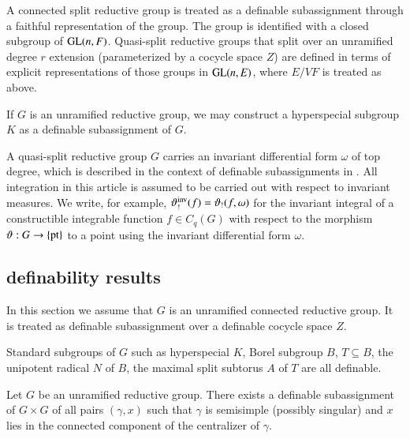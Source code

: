 A connected split reductive group is treated as a definable
subassignment through a faithful representation of the group.  The
group is identified with a closed subgroup of ${\operatorname{GL}}(n,F)$.
Quasi-split reductive groups that split over an unramified degree $r$
extension (parameterized by a cocycle space $Z$) are defined in terms
of explicit representations of those groups in ${\operatorname{GL}}(n,E)$, where
$E/VF$ is treated as above.

If $G$ is an unramified reductive group, we may construct a
hyperspecial subgroup $K$ as a definable subassignment of $G$.

A quasi-split reductive group $G$ carries an invariant differential
form $\omega$ of top degree, which is described in the context of
definable subassignments in \cite{gordon}.  All integration in this
article is assumed to be carried out with respect to invariant
measures.  We write, for example, $\vartheta_!^{\operatorname{inv}}(f) =
\vartheta_!(f,\omega)$ for the invariant integral of a constructible
integrable function $f\in C_q(G)$ with respect to the morphism
$\vartheta:G\to\{{\operatorname{pt}}\}$ to a point using the invariant
differential form $\omega$.

\subsection{definability results}\label{sec:definability}

In this section we assume that $G$ is an unramified connected
reductive group.  It is treated as definable subassignment over a
definable cocycle space $Z$.

Standard subgroups of $G$ such as hyperspecial $K$, Borel subgroup
$B$, $T\subseteq B$, the unipotent radical $N$ of $B$, the maximal
split subtorus $A$ of $T$ are all definable.


\begin{lemma}  
  Let $G$ be an unramified reductive group.  There exists a definable
  subassignment of $G\times G$ of all pairs $(\gamma,x)$ such that
  $\gamma$ is semisimple (possibly singular) and $x$ lies in the
  connected component of the centralizer of $\gamma$.
\end{lemma}

